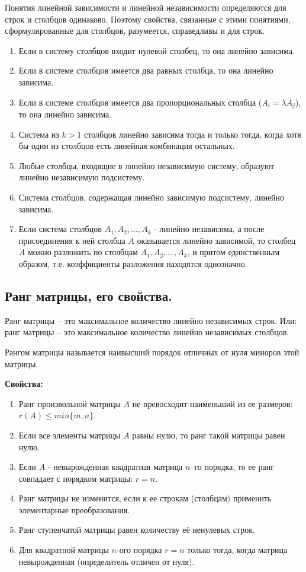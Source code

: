 \documentclass[a4paper,14pt]{article}
\begin{document}
Понятия линейной зависимости и линейной независимости определяются для строк и столбцов одинаково. Поэтому свойства, связанные с этими понятиями, сформулированные для столбцов, разумеется, справедливы и для строк.
\begin{enumerate}
	\item Если в систему столбцов входит нулевой столбец, то она линейно зависима.
	\item Если в системе столбцов имеется два равных столбца, то она линейно зависима.
	\item Если в системе столбцов имеется два пропорциональных столбца ($A_i = \lambda A_j$), то она линейно зависима.
	\item Система из $k>1$ столбцов линейно зависима тогда и только тогда, когда хотя бы один из столбцов есть линейная комбинация остальных.
	\item Любые столбцы, входящие в линейно независимую систему, образуют линейно независимую подсистему.
	\item Система столбцов, содержащая линейно зависимую подсистему, линейно зависима.
	\item Если система столбцов $A_1, A_2, ..., A_k$ - линейно независима, а после присоединения к ней столбца $A$ оказывается линейно зависимой, то столбец $A$ можно разложить по столбцам $A_1, A_2, ..., A_k$, и притом единственным образом, т.е. коэффициенты разложения находятся однозначно.
\end{enumerate}
\subsection{Ранг матрицы, его свойства.}
\begin{definition}
	Ранг матрицы – это максимальное количество линейно независимых строк. Или: ранг матрицы – это максимальное количество линейно независимых столбцов.
	
	Рангом матрицы называется наивысший порядок отличных от нуля миноров этой матрицы.
\end{definition}
\textbf{Свойства:}
\begin{enumerate}
	\item Ранг произвольной матрицы $A$ не превосходит наименьший из ее размеров: $r(A) \le min\{m, n\}$.
	\item Если все элементы матрицы $A$ равны нулю, то ранг такой матрицы равен нулю.
	\item Если $A$ - невырожденная квадратная матрица $n$–го порядка, то ее ранг совпадает с порядком матрицы: $r = n$.
	\item Ранг матрицы не изменится, если к ее строкам (столбцам) применить элементарные преобразования.
	\item Ранг ступенчатой матрицы равен количеству её ненулевых строк.
	\item Для квадратной матрицы $n$-ого порядка $r=n$ только тогда, когда матрица невырожденная (определитель отличен от нуля).
\end{enumerate}
\end{document}

